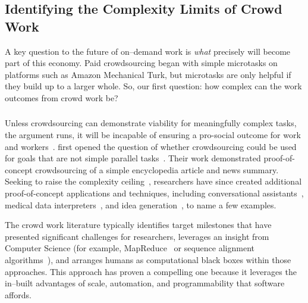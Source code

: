 \documentclass[trackingWork]{subfiles}
\begin{document}
\begin{comment}
Crowdwork
  - Kittur said let's do complex stuff
  - This works by using CS techniques
  - Clear that this works in focused cases
  - More recent shift toward using experts
\end{comment}

\subsection[What are the complexity limits of crowd work]{Identifying the Complexity Limits of Crowd Work}\label{sec:complexity}
A key question to the future of on--demand work is \textit{what} precisely will become part of this economy. Paid crowdsourcing began with simple microtasks on platforms such as Amazon Mechanical Turk, but microtasks are only helpful if they build up to a larger whole. So, our first question: how complex can the work outcomes from crowd work be?

\subsubsection{\crowdworkpers}

Unless crowdsourcing can demonstrate viability for meaningfully complex tasks, the argument runs, it will be incapable of ensuring a pro-social outcome for work and workers~\cite{crowdworkFuture}.
\citeauthor{crowdForgeKittur} first opened the question of whether crowdsourcing could be used for goals that are not simple parallel tasks~\cite{crowdForgeKittur}.
Their work demonstrated proof-of-concept crowdsourcing of a simple encyclopedia article and news summary.
Seeking to raise the complexity ceiling~\cite{myers2000past}, researchers have since created additional proof-of-concept applications and techniques, including conversational assistants~\cite{Lasecki:2013:CCC:2501988.2502057}, medical data interpreters~\cite{Lasecki:2013:CCC:2501988.2502057}, and idea generation~\cite{YuEncouragingOutside,yu2014distributed,Yu2016a}, to name a few examples.

The crowd work literature typically identifies target milestones that have presented significant challenges for researchers, leverages an insight from Computer Science (for example, MapReduce~\cite{crowdForgeKittur} or sequence alignment algorithms~\cite{lasecki2012real}), and arranges humans as computational black boxes within those approaches.
This approach has proven a compelling one because
it leverages the in--built advantages of scale, automation, and programmability that software affords.
\end{document}

